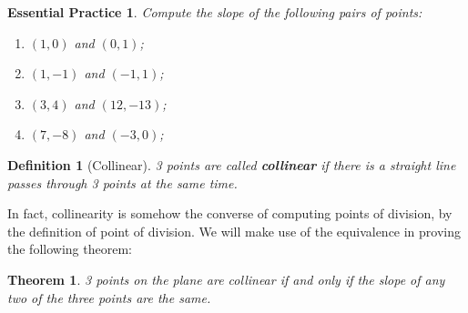 \documentclass[12pt]{article}
\newtheorem{definition}{Definition}[section]
\newtheorem*{theorem}{Theorem}
\newtheorem{exercise}{Essential Practice}[subsection]
\begin{document}
    \begin{exercise}
        Compute the slope of the following pairs of points:\begin{enumerate}
            \item $(1,0)$ and $(0,1)$;
            \item $(1,-1)$ and $(-1,1)$;
            \item $(3,4)$ and $(12,-13)$;
            \item $(7,-8)$ and $(-3,0)$;
        \end{enumerate}
    \end{exercise}

    \begin{definition}[Collinear]
        3 points are called \textbf{collinear} if there is a straight line passes through 3 points at the same time.
    \end{definition}

    In fact, collinearity is somehow the converse of computing points of division, by the definition of point of division. We will make use of the equivalence in proving the following theorem:

    \begin{theorem}
        3 points on the plane are collinear if and only if the slope of any two of the three points are the same.
    \end{theorem}
\end{document}

